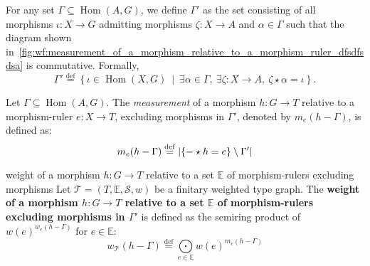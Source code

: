 For any set \( \Gamma \subseteq \operatorname{Hom}(A, G) \),
    we define $\Gamma'$ as the set consisting of all morphisms \( \iota : X \to G \) admitting morphisms \( \zeta \colon X \to A \) and \( \alpha \in \Gamma \) such that the diagram shown in~\autoref{fig:wf:measurement_of_a_morphism_relative_to_a_morphism_ruler_dfsdfsdsa} is commutative.  Formally,  
    \[
    \Gamma' \overset{\operatorname{def}}{=} \left\{ \iota \in \operatorname{Hom}(X, G)~\middle|~\exists \alpha \in \Gamma,~\exists \zeta:X \to A,~\zeta \star \alpha = \iota \right\}. 
    \]
    \begin{figure}[H]
    \centering
    \caption{}
    \label{fig:wf:measurement_of_a_morphism_relative_to_a_morphism_ruler_dfsdfsdsa}
\end{figure} 
    

\begin{definition}
    \label{def:weight_excluding_pre}
    Let \( \Gamma \subseteq \operatorname{Hom}(A, G) \).
    The \emph{measurement} of a morphism \( h:G \to T \) relative to a morphism-ruler \( e: X \to T \), excluding morphisms in \( \Gamma' \), denoted by $m_e(h-\Gamma)$, is defined as:
    \[
        m_e(h-\Gamma) \overset{\operatorname{def}}{=} 
            |\{- \star h = e\} \setminus \Gamma'|
    \]
\end{definition}
\begin{definition}
    \label{def:weight_excluding}
    weight of a morphism $h: G \to T$ relative to a set $\mathbb{E}$ of morphism-rulers excluding morphisms
    Let $\mathcal{T}=(T,\mathbb{E},\mathcal{S},w)$ be a finitary weighted type graph. The \textbf{weight of a morphism $h: G \to T$ relative to a set $\mathbb{E}$ of morphism-rulers excluding morphisms in \( \Gamma' \)} is defined as the semiring product of $w(e)^{w_e(h-\Gamma)}$ for $e \in \mathbb{E}$:
    \[ 
        w_\mathcal{T}(h-\Gamma) \overset{\operatorname{def}}{=} \underset{e \in \mathbb{E}}{\bigodot} 
    w(e)^{m_e(h-\Gamma)}
            \]
\end{definition}

